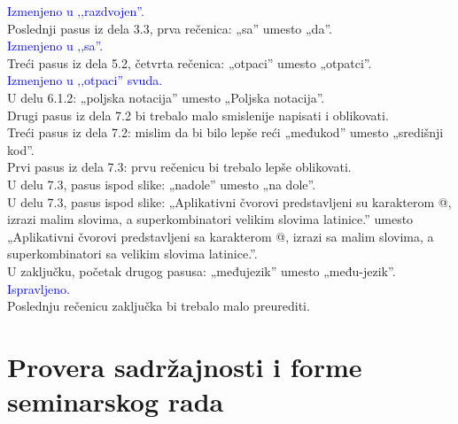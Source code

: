 \documentclass[a4paper]{report}
\newcommand{\odgovor}[1]{\textcolor{blue}{#1}}
\begin{document}
\odgovor{Izmenjeno u ‚‚razdvojen''.}\\

Poslednji pasus iz dela 3.3, prva rečenica: „sa” umesto „da”.\\

\odgovor{Izmenjeno u ‚‚sa''.}\\

Treći pasus iz dela 5.2, četvrta rečenica: „otpaci” umesto „otpatci”.\\

\odgovor{Izmenjeno u ‚‚otpaci'' svuda.}\\

U delu 6.1.2: „poljska notacija” umesto „Poljska notacija”.\\

Drugi pasus iz dela 7.2 bi trebalo malo smislenije napisati i oblikovati.\\

Treći pasus iz dela 7.2: mislim da bi bilo lepše reći „međukod” umesto „središnji kod”.\\

Prvi pasus iz dela 7.3: prvu rečenicu bi trebalo lepše oblikovati.\\

U delu 7.3, pasus ispod slike: „nadole” umesto „na dole”.\\

U delu 7.3, pasus ispod slike: „Aplikativni čvorovi predstavljeni su karakterom @, izrazi malim slovima, a superkombinatori velikim slovima latinice.” umesto „Aplikativni čvorovi predstavljeni sa karakterom @, izrazi sa malim slovima, a superkombinatori sa velikim slovima latinice.”.\\

U zaključku, početak drugog pasusa: „međujezik” umesto „među-jezik”.\\

\odgovor{Ispravljeno.}\\

Poslednju rečenicu zaključka bi trebalo malo preurediti.\\

\section{Provera sadržajnosti i forme seminarskog rada}
\end{document}
